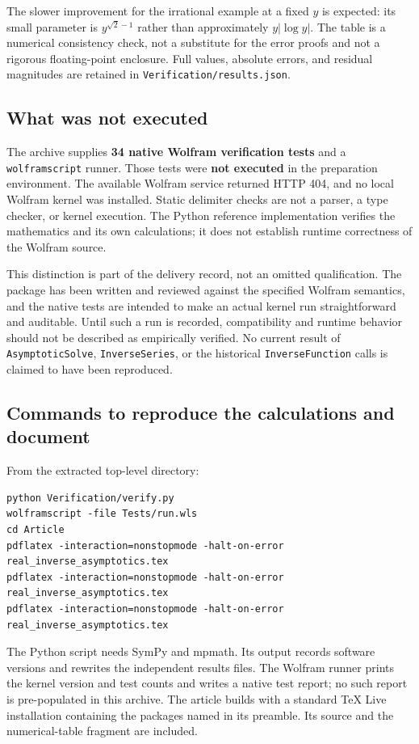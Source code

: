 \documentclass[11pt,a4paper]{article}
\numberwithin{equation}{section}
\theoremstyle{definition}
\newcommand{\code}[1]{\texttt{#1}}
\begin{document}
The slower improvement for the irrational example at a fixed $y$ is
expected: its small parameter is $y^{\sqrt2-1}$ rather than approximately
$y|\log y|$. The table is a numerical consistency check, not a substitute
for the error proofs and not a rigorous floating-point enclosure.
Full values, absolute errors, and residual magnitudes are retained in
\code{Verification/results.json}.

\subsection{What was not executed}
The archive supplies \textbf{34 native Wolfram verification tests} and a
\code{wolframscript} runner. Those tests were \textbf{not executed} in the
preparation environment. The available Wolfram service returned HTTP 404,
and no local Wolfram kernel was installed. Static delimiter checks are
not a parser, a type checker, or kernel execution. The Python reference
implementation verifies the mathematics and its own calculations; it
does not establish runtime correctness of the Wolfram source.

This distinction is part of the delivery record, not an omitted
qualification. The package has been written and reviewed against the
specified Wolfram semantics, and the native tests are intended to make
an actual kernel run straightforward and auditable. Until such a run is
recorded, compatibility and runtime behavior should not be described as
empirically verified. No current result of \code{AsymptoticSolve},
\code{InverseSeries}, or the historical \code{InverseFunction} calls is
claimed to have been reproduced.

\subsection{Commands to reproduce the calculations and document}
From the extracted top-level directory:
\begin{lstlisting}[language={}]
python Verification/verify.py
wolframscript -file Tests/run.wls
cd Article
pdflatex -interaction=nonstopmode -halt-on-error real_inverse_asymptotics.tex
pdflatex -interaction=nonstopmode -halt-on-error real_inverse_asymptotics.tex
pdflatex -interaction=nonstopmode -halt-on-error real_inverse_asymptotics.tex
\end{lstlisting}
The Python script needs SymPy and mpmath. Its output records software
versions and rewrites the independent results files. The Wolfram runner
prints the kernel version and test counts and writes a native test report;
no such report is pre-populated in this archive. The article builds with
a standard TeX Live installation containing the packages named in its
preamble. Its source and the numerical-table fragment are included.
\end{document}
